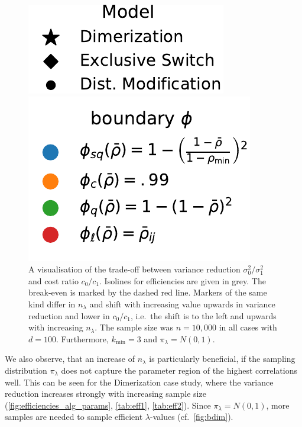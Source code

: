 \begin{figure}[tb]
\begin{minipage}{\textwidth}
    \end{minipage}
    \hfill
    \begin{minipage}{.4\textwidth}
	    \vfill
    \includegraphics[scale=.5]{gfx/legend_models.pdf}
	    \vfill
    \end{minipage}
    \begin{minipage}{.4\textwidth}
	    \vfill
    \includegraphics[scale=.5]{gfx/legend_phi.pdf}
	    \vfill
    \end{minipage}
    \hfill
	\caption[Overview of the cost v.\ variance reduction trade-off]{A visualisation of the trade-off between variance reduction $\sigma_0^2/\sigma_1^2$
    and cost ratio $c_0/c_1$. Isolines for efficiencies are given in grey. The break-even
    is marked by the dashed red line.
    Markers of the same kind differ in $n_{\lambda}$ and shift with increasing value
    upwards in variance reduction and lower in $c_0/c_1$, i.e.\ the shift is to the left and upwards
    with increasing $n_{\lambda}$.
    The sample size was $n=10,\!000$ in all cases
    with $d=100$. Furthermore, $k_{\min}=3$ and $\pi_\lambda=N(0,1)$.}
    \label{fig:trade_off}
\end{figure}

We also observe, that an increase of $n_{\lambda}$ is particularly beneficial, if
the sampling distribution $\pi_{\lambda}$ does not capture the parameter region of
the highest correlations well.
This can be seen for the Dimerization case study, where the variance reduction increases
strongly with increasing sample size (\autoref{fig:efficiencies_alg_params}, \autoref{tab:eff1}, \autoref{tab:eff2}).
Since $\pi_{\lambda}=N(0,1)$, more samples are needed to sample efficient $\lambda$-values (cf.\ \autoref{fig:bdim}).

